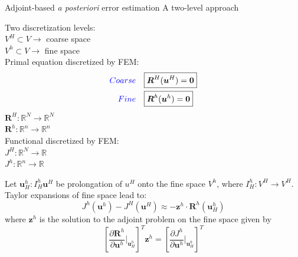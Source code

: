 \documentclass[fleqn]{beamer}
\newcommand{\bs}[1]{\boldsymbol{#1}}
\begin{document}
\begin{frame}{Adjoint-based \emph{a posteriori} error estimation}
{A two-level approach}
\scriptsize

\begin{minipage}{.5\textwidth}
Two discretization levels: \\
$V^H \subset V \rightarrow$ coarse space \\
$V^h \subset V \rightarrow$  fine space \\ [8pt]
%
Primal equation discretized by FEM:
\begin{equation*}
\begin{aligned}
{\color{blue} Coarse} \quad & \boxed{ \bs{R}^H(\bs{u}^H) = \bs{0} } \\
{\color{blue} Fine} \quad & \boxed{ \bs{R}^h(\bs{u}^h) = \bs{0}} \\
\end{aligned}
\end{equation*}
%
$\bs{R}^H : \mathbb{R}^N \to \mathbb{R}^N$ \\
$\bs{R}^h : \mathbb{R}^n \to \mathbb{R}^n$ \\ [8pt]
%
Functional discretized by FEM: \\
$J^H : \mathbb{R}^N \to \mathbb{R}$ \\
$J^h : \mathbb{R}^n \to \mathbb{R}$ \\
\end{minipage}%
\begin{minipage}{0.5\textwidth}
%
Let $\bs{u}^h_H : I^h_H \bs{u}^H$ be prolongation of $u^H$
onto the fine space $V^h$, where $I^h_H : V^H \to V^H$. \\ [8pt]
Taylor expansions of fine space lead to:
%
\begin{equation*}
J^h(\bs{u}^h) - J^H(\bs{u}^H) \approx - \bs{z}^h \cdot \bs{R}^h(\bs{u}^h_H)
\end{equation*}
%
where $\bs{z}^h$ is the solution to the adjoint problem on
the fine space given by
%
\begin{equation*}
\left[ \frac{\partial \bs{R}^h}{\partial \bs{u}^h} \biggr|_{\bs{u}^h_H} \right]^T
\bs{z}^h =
\left[ \frac{\partial J^h}{\partial \bs{u}^h} \biggr|_{\bs{u}^h_H} \right]^T
\end{equation*}
\end{minipage}
\end{frame}

\end{document}
